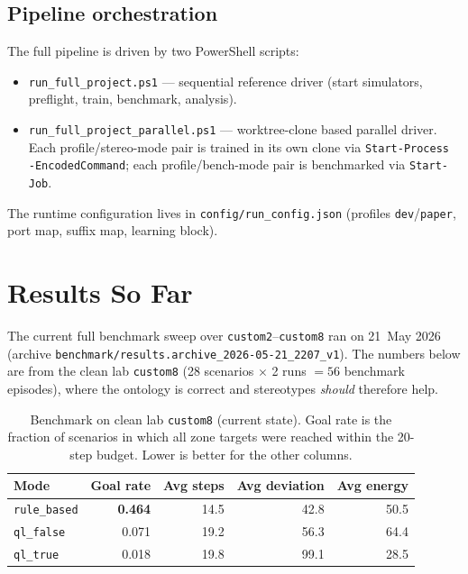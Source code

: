 \documentclass[conference]{IEEEtran}
\begin{document}
\subsection{Pipeline orchestration}
The full pipeline is driven by two PowerShell scripts:
\begin{itemize}
  \item \verb|run_full_project.ps1| --- sequential reference driver
        (start simulators, preflight, train, benchmark, analysis).
  \item \verb|run_full_project_parallel.ps1| --- worktree-clone
        based parallel driver. Each profile/stereo-mode pair is
        trained in its own clone via
        \verb|Start-Process -EncodedCommand|; each profile/bench-mode
        pair is benchmarked via \verb|Start-Job|.
\end{itemize}
The runtime configuration lives in \verb|config/run_config.json|
(profiles \verb|dev|/\verb|paper|, port map, suffix map, learning block).

\section{Results So Far}
\label{sec:results}

The current full benchmark sweep over \verb|custom2|--\verb|custom8|
ran on 21~May 2026 (archive
\verb|benchmark/results.archive_2026-05-21_2207_v1|). The numbers below are
from the clean lab \verb|custom8| (28 scenarios $\times$ 2 runs $= 56$
benchmark episodes), where the ontology is correct and stereotypes
\emph{should} therefore help.

\begin{table}[h]
\caption{Benchmark on clean lab \texttt{custom8} (current state).
Goal rate is the fraction of scenarios in which all zone targets were
reached within the 20-step budget. Lower is better for the other columns.}
\label{tab:custom8}
\centering
\footnotesize
\begin{tabular}{@{}lrrrr@{}}
\toprule
Mode & Goal rate & Avg steps & Avg deviation & Avg energy\\
\midrule
\texttt{rule\_based} & \textbf{0.464} & 14.5 & 42.8  & 50.5 \\
\texttt{ql\_false}   & 0.071          & 19.2 & 56.3  & 64.4 \\
\texttt{ql\_true}    & 0.018          & 19.8 & 99.1  & 28.5 \\
\bottomrule
\end{tabular}
\end{table}
\end{document}
